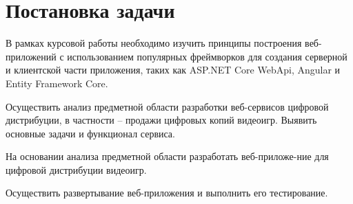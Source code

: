 \section{Постановка задачи}
\label{sec:practice:task_statement}

В рамках курсовой работы необходимо изучить принципы построения веб-приложений с использованием популярных фреймворков для создания
серверной и клиентской части приложения, таких как ASP.NET Core WebApi, Angular и Entity Framework Core. 

Осуществить анализ предметной области разработки веб-сервисов цифровой дистрибуции, в частности -- продажи цифровых копий видеоигр.
Выявить основные задачи и функционал сервиса.

На основании анализа предметной области разработать веб-приложе-ние для цифровой дистрибуции видеоигр.

Осуществить развертывание веб-приложения и выполнить его тестирование.

